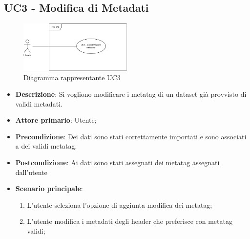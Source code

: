 \subsection{UC3 - Modifica di Metadati}
\label{sub:uc2}

\begin{figure}[h]
    \centering
    \includegraphics[width=0.5\textwidth]{componenti/casi-duso/diagrammi/UC2.pdf}
    \caption{Diagramma rappresentante UC3}
    \label{fig:UC2}
\end{figure}

\begin{itemize}
    \item \textbf{Descrizione}: Si vogliono modificare i metatag di un dataset già provvisto 
                                di validi metadati.
	
    \item \textbf{Attore primario}: Utente;
    
    \item \textbf{Precondizione}: 	Dei dati sono stati correttamente importati e 
                                    sono associati a dei validi metatag.

	\item \textbf{Postcondizione}:  Ai dati sono stati assegnati dei metatag assegnati dall'utente 

	\item \textbf{Scenario principale}:
		\begin{enumerate}
			\item L'utente seleziona l'opzione di aggiunta modifica dei metatag;
			\item L'utente modifica i metadati degli header che preferisce con metatag validi;
		\end{enumerate}
\end{itemize}

